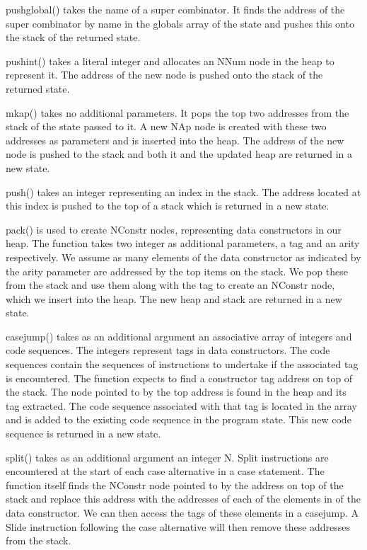 pushglobal() takes the name of a super combinator. It finds 
the address of the super combinator by name in the globals 
array of the state and pushes this onto the stack of the returned
state.

pushint() takes a literal integer and allocates an NNum node
in the heap to represent it. The address of the new node is
pushed onto the stack of the returned state.

mkap() takes no additional parameters. It pops the top two 
addresses from the stack of the state passed to it. A new
NAp node is created with these two addresses as parameters
and is inserted into the heap. The address of the new node
is pushed to the stack and both it and the updated heap
are returned in a new state. 

push() takes an integer representing an index in the stack.
The address located at this index is pushed to the top of
a stack which is returned in a new state.

pack() is used to create NConstr nodes, representing data
constructors in our heap. The function takes two integer
as additional parameters, a tag and an arity respectively.
We assume as many elements of the data constructor as 
indicated by the arity parameter are addressed by the top
items on the stack. We pop these from the stack and use
them along with the tag to create an NConstr node, which 
we insert into the heap. The new heap and stack are 
returned in a new state.

casejump() takes as an additional argument an associative
array of integers and code sequences. The integers represent
tags in data constructors. The code sequences contain the 
sequences of instructions to undertake if the associated tag
is encountered. The function expects to find a constructor
tag address on top of the stack. The node pointed to by the
top address is found in the heap and its tag extracted. The
code sequence associated with that tag is located in the array
and is added to the existing code sequence in the program
state. This new code sequence is returned in a new state.

split() takes as an additional argument an integer N. Split
instructions are encountered at the start of each case 
alternative in a case statement. The function itself finds
the NConstr node pointed to by the address on top of the
stack and replace this address with the addresses of each
of the elements in of the data constructor. We can then
access the tags of these elements in a casejump. A Slide
instruction following the case alternative will then remove
these addresses from the stack. 

